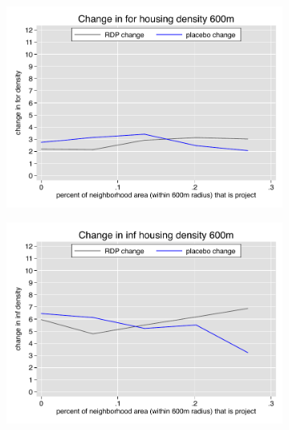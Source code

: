 \documentclass[12pt]{article}
\begin{document}
\begin{figure}
        \begin{subfigure}[b]{0.495\textwidth}
            \centering
            \includegraphics[width=\textwidth,trim={0.3cm .3cm 0.1cm 0cm}, clip=true]{figures/change_for_600_total.pdf}
        \end{subfigure}
        \hfill
        \begin{subfigure}[b]{0.495\textwidth}  
            \centering 
            \includegraphics[width=\textwidth,trim={0.3cm .3cm 0.1cm 0cm}, clip=true]{figures/change_inf_600_total.pdf}
        \end{subfigure}
        \vspace{-6mm}
    \end{figure} 
\end{document}
